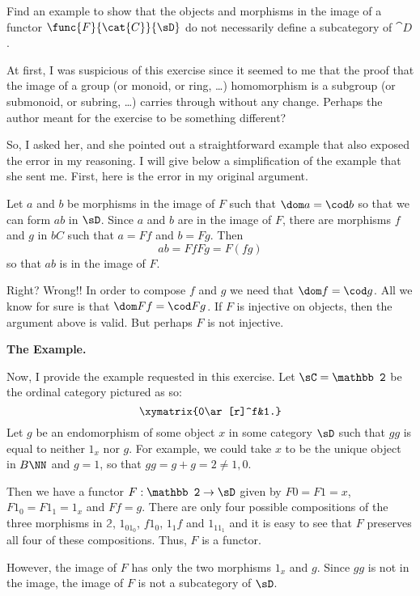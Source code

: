\documentclass[main.tex]{subfiles}
\begin{document}
\begin{exercise}
Find an example to show that the objects and morphisms in the image of a functor
\(\func{F}{\cat{C}}{\sD}\) do not necessarily define a subcategory of
\(\cat{D}\).
\end{exercise}

At first, I was suspicious of this exercise since it seemed to me that the proof
that the image of a group (or monoid, or ring, \dots) homomorphism is a subgroup
(or submonoid, or subring, \dots) carries through without any change. Perhaps
the author meant for the exercise to be something different?

So, I asked her, and she pointed out a straightforward example that also exposed
the error in my reasoning. I will give below a simplification of the example
that she sent me. First, here is the error in my original argument.

Let \(a\) and \(b\) be morphisms in the image of \(F\) such that \(\dom a=\cod
b\) so that we can form \(ab\) in \(\sD\). Since \(a\) and \(b\) are in the
image of \(F\), there are morphisms \(f\) and \(g\) in \( bC\) such that
\(a=Ff\) and \(b=Fg\). Then \[ab=FfFg=F(fg)\] so that \(ab\) is in the image of
\(F\).

Right? Wrong!! In order to compose \(f\) and \(g\) we need that \(\dom f=\cod
g\). All we know for sure is that \(\dom Ff=\cod Fg\). If \(F\) is injective on
objects, then the argument above is valid. But perhaps \(F\) is not injective.

\begin{center}{\bf The Example.}\end{center} Now, I provide the example
requested in this exercise. Let \(\sC={\mathbb 2}\) be the ordinal category
pictured as so: \[\xymatrix{0\ar[r]^f&1.}\] Let \(g\) be an endomorphism of some
object \(x\) in some category \(\sD\) such that \(gg\) is equal to neither
\(1_x\) nor \(g\). For example, we could take \(x\) to be the unique object in
\(B\NN\) and \(g=1\), so that \(gg=g+g=2\ne 1,0\).

Then we have a functor \(F:{\mathbb 2}\rightarrow\sD\) given by \(F0=F1=x\),
\(F1_0=F1_1=1_x\) and \(Ff=g\). There are only four possible compositions of the
three morphisms in \({\mathbb 2}\), \(1_01_0\), \(f1_0\), \(1_1f\) and
\(1_11_1\) and it is easy to see that \(F\) preserves all four of these
compositions. Thus, \(F\) is a functor.

However, the image of \(F\) has only the two morphisms \(1_x\) and \(g\). Since
\(gg\) is not in the image, the image of \(F\) is not a subcategory of \(\sD\).
\end{document}
